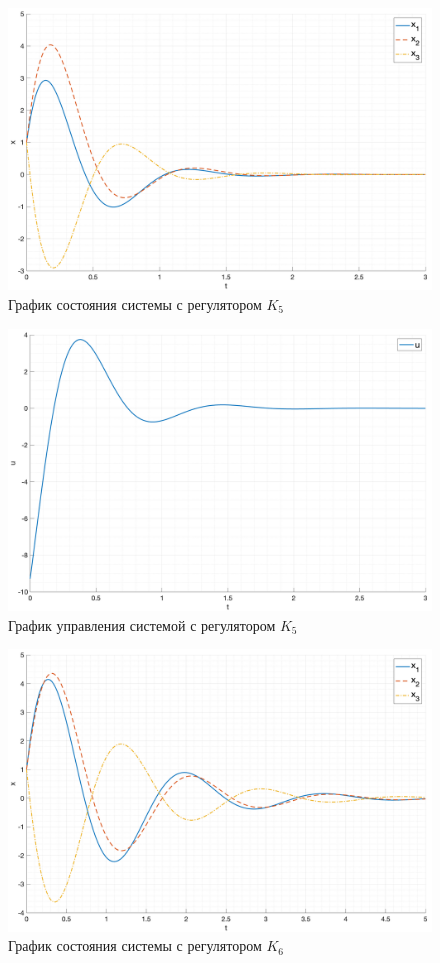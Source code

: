 \begin{figure}[ht!]
    \centering
    \includegraphics[width=\textwidth]{media/plots/task1_7_x.png}
    \caption{График состояния системы с регулятором $K_5$}
    \label{fig:task1_7_x}
\end{figure}
\begin{figure}[ht!]
    \centering
    \includegraphics[width=\textwidth]{media/plots/task1_7_u.png}
    \caption{График управления системой с регулятором $K_5$}
    \label{fig:task1_7_u}
\end{figure}
\begin{figure}[ht!]
    \centering
    \includegraphics[width=\textwidth]{media/plots/task1_8_x.png}
    \caption{График состояния системы с регулятором $K_6$}
    \label{fig:task1_8_x}
\end{figure}
